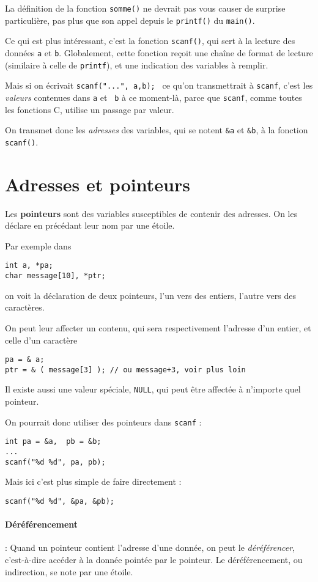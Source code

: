 \documentclass[10pt]{article}
\begin{document}
La définition de la fonction \texttt{somme()} ne devrait pas vous
causer de surprise particulière, pas plus que son appel depuis le
\texttt{printf()} du \texttt{main()}.

Ce qui est plus intéressant, c'est la fonction \texttt{scanf()}, qui sert
à la lecture des données \texttt{a} et \texttt{b}. Globalement, cette 
fonction reçoit une chaîne de format de lecture (similaire à celle
de \texttt{printf}), et une indication des variables à remplir.

Mais si on écrivait \texttt{scanf("...", a,b); } ce qu'on transmettrait
à \texttt{scanf}, c'est les \emph{valeurs} contenues dans \texttt{a}
et  \texttt{b} à ce moment-là, parce que \texttt{scanf}, comme toutes les
fonctions C, utilise un passage par valeur.

On transmet donc les \emph{adresses} des variables, 
qui se notent \texttt{\&a} et \texttt{\&b}, à la fonction \texttt{scanf()}.

\section{Adresses et pointeurs}

Les \textbf{pointeurs} sont des variables susceptibles de
contenir des adresses. 
On les déclare en précédant leur nom par une étoile. 

Par exemple dans
\begin{verbatim}
int a, *pa;
char message[10], *ptr;
\end{verbatim}
on voit la déclaration de deux pointeurs, l'un vers des entiers,
l'autre vers des caractères.

On peut leur affecter un contenu, qui sera respectivement l'adresse d'un
entier, et celle d'un caractère
\begin{verbatim}
pa = & a;
ptr = & ( message[3] ); // ou message+3, voir plus loin
\end{verbatim}
Il existe aussi une valeur spéciale, \texttt{NULL}, qui peut être 
affectée à n'importe
quel pointeur.

On pourrait donc utiliser des pointeurs dans \texttt{scanf} :
\begin{verbatim}
int pa = &a,  pb = &b;
...
scanf("%d %d", pa, pb);
\end{verbatim}
Mais ici c'est plus simple de faire directement :
\begin{verbatim}
scanf("%d %d", &pa, &pb);
\end{verbatim}

\paragraph{Déréférencement} : Quand un pointeur contient l'adresse d'une donnée, on peut le \emph{déréférencer},
c'est-à-dire accéder à la donnée pointée par le pointeur. 
Le déréférencement, 
ou indirection, se note par une étoile.
\end{document}
